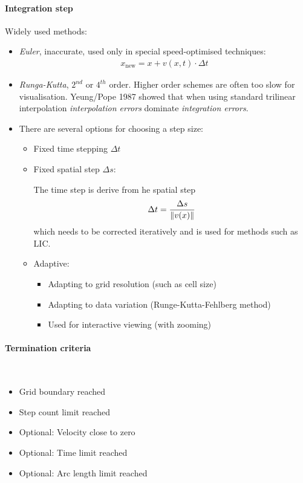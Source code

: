 \paragraph{Integration step} Widely used methods:
\begin{itemize}
    \item \emph{Euler}, inaccurate, used only in special speed-optimised techniques:
        \begin{align*}
            x_\text{new} = x+ v(x,t)\cdot \Delta t
        \end{align*}
    \item \emph{Runga-Kutta}, $2^{nd}$ or $4^{th}$ order.  Higher order schemes are often too slow for visualisation. Yeung/Pope 1987 showed that when using standard trilinear interpolation \emph{interpolation errors} dominate \emph{integration errors}.
    \item There are several options for choosing a step size:
        \begin{itemize}
            \item Fixed time stepping $\Delta t$
            \item Fixed spatial step $\Delta s$:
                
                The time step is derive from he spatial step
                    \begin{align*}
                        \Delta t = {\Delta s \over \left\lVert v(x)\right\rVert}
                    \end{align*}
                which needs to be corrected iteratively and is used for methods such as LIC.
            \item Adaptive:
                \begin{itemize}
                    \item Adapting to grid resolution (such as cell size)
                    \item Adapting to data variation (Runge-Kutta-Fehlberg method)
                    \item Used for interactive viewing (with zooming)
                \end{itemize}
            \end{itemize}
        
\end{itemize}


\paragraph{Termination criteria} $\ $
\begin{itemize}
    \item Grid boundary reached
    \item Step count limit reached
    \item Optional: Velocity close to zero
    \item Optional: Time limit reached
    \item Optional: Arc length limit reached
\end{itemize}



